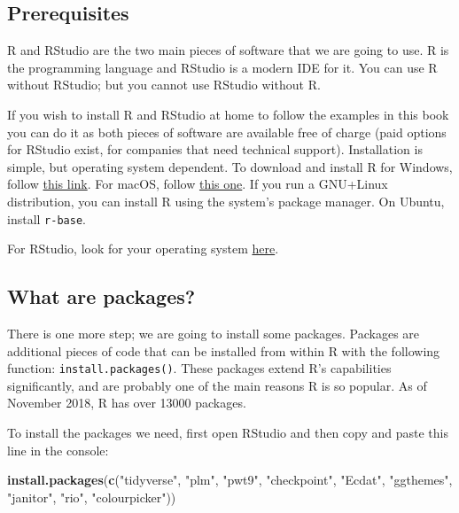 \documentclass[]{gitbook}
\newenvironment{Shaded}{\begin{snugshade}}{\end{snugshade}}
\newcommand{\KeywordTok}[1]{\textcolor[rgb]{0.13,0.29,0.53}{\textbf{#1}}}
\newcommand{\NormalTok}[1]{#1}
\newcommand{\StringTok}[1]{\textcolor[rgb]{0.31,0.60,0.02}{#1}}
\theoremstyle{definition}
\theoremstyle{definition}
\theoremstyle{definition}
\theoremstyle{remark}
\begin{document}
\hypertarget{prerequisites}{%
\subsection*{Prerequisites}\label{prerequisites}}

R and RStudio are the two main pieces of software that we are going to
use. R is the programming language and RStudio is a modern IDE for it.
You can use R without RStudio; but you cannot use RStudio without R.

If you wish to install R and RStudio at home to follow the examples in
this book you can do it as both pieces of software are available free of
charge (paid options for RStudio exist, for companies that need
technical support). Installation is simple, but operating system
dependent. To download and install R for Windows, follow
\href{https://cloud.r-project.org/bin/windows/base/}{this link}. For
macOS, follow \href{https://cloud.r-project.org/bin/macosx/}{this one}.
If you run a GNU+Linux distribution, you can install R using the
system's package manager. On Ubuntu, install \texttt{r-base}.

For RStudio, look for your operating system
\href{https://www.rstudio.com/products/rstudio/download/\#download}{here}.

\hypertarget{what-are-packages}{%
\subsection*{What are packages?}\label{what-are-packages}}

There is one more step; we are going to install some packages. Packages
are additional pieces of code that can be installed from within R with
the following function: \texttt{install.packages()}. These packages
extend R's capabilities significantly, and are probably one of the main
reasons R is so popular. As of November 2018, R has over 13000 packages.

To install the packages we need, first open RStudio and then copy and
paste this line in the console:

\begin{Shaded}
\begin{Highlighting}[]
\KeywordTok{install.packages}\NormalTok{(}\KeywordTok{c}\NormalTok{(}\StringTok{"tidyverse"}\NormalTok{, }\StringTok{"plm"}\NormalTok{, }\StringTok{"pwt9"}\NormalTok{, }\StringTok{"checkpoint"}\NormalTok{, }\StringTok{"Ecdat"}\NormalTok{, }\StringTok{"ggthemes"}\NormalTok{, }\StringTok{"janitor"}\NormalTok{, }\StringTok{"rio"}\NormalTok{, }\StringTok{"colourpicker"}\NormalTok{))}
\end{Highlighting}
\end{Shaded}
\end{document}

